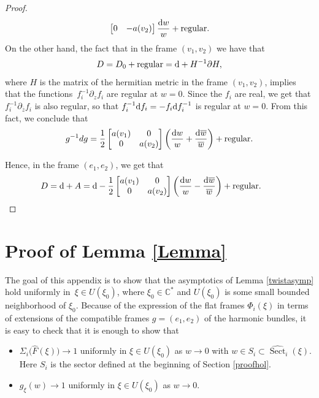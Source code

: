 \begin{proof}
\begin{equation*}
\begin{bmatrix}
 0 & -a(v_2) \\
 \end{bmatrix}\frac{{\rm d}w}{w}+\text{regular}.
\end{equation*}
On the other hand, the fact that in the frame $(v_1,v_2)$ we have that
\begin{equation*}
 D=D_0 +\text{regular}= {\rm d} + H^{-1}\partial H,
\end{equation*}
where $H$ is the matrix of the hermitian metric in the frame $(v_1,v_2)$,
implies that the functions~${f_i^{-1}\partial_{z} f_i}$ are regular at $w=0$. Since the $f_i$ are real, we get that $f_i^{-1}\partial_{\overline{z}}f_i$ is also regular, so that $f_i^{-1}{\rm d}f_i=-f_i{\rm d}f_i^{-1}$ is regular at $w=0$. From this fact, we conclude that
\begin{equation*}
 g^{-1}dg= \frac{1}{2}\begin{bmatrix} a(v_1) & 0 \\
 0 & a(v_2) \\
 \end{bmatrix}\left(\frac{{\rm d}w}{w}+ \frac{{\rm d}\overline{w}}{\overline{w}}\right) + \text{regular}.
\end{equation*}

Hence, in the frame $(e_1,e_2)$, we get that
\begin{equation*}
 D={\rm d}+A={\rm d} - \frac{1}{2}\begin{bmatrix} a(v_1) & 0 \\
 0 & a(v_2) \\
 \end{bmatrix}\left(\frac{{\rm d}w}{w}- \frac{{\rm d}\overline{w}}{\overline{w}}\right) + \text{regular}.\tag*{\qed}
\end{equation*} \renewcommand{\qed}{}
\end{proof}

\section{Proof of Lemma \ref{Lemma}}\label{AC}

The goal of this appendix is to show that the asymptotics of Lemma \ref{twistasymp} hold uniformly in~${\xi \in U(\xi_0)}$, where $\xi_0 \in \mathbb{C}^*$ and $U(\xi_0)$ is some small bounded neighborhood of $\xi_0$. Because of the expression of the flat frames $\Phi_i(\xi)$ in terms of extensions of the compatible frames $g=(e_1,e_2)$ of the harmonic bundles, it is easy to check that it is enough to show that
\begin{itemize}\itemsep=0pt
 \item $\Sigma_i\bigl(\widehat{F}(\xi)\bigr) \to 1$ uniformly in $\xi \in U(\xi_0)$ as $w\to 0$ with $w\in S_i \subset \widehat{\operatorname{Sect}}_i(\xi)$. Here $S_i$ is the sector defined at the beginning of Section \ref{proofhol}.
 \item $g_{\xi}(w)\to 1$ uniformly in $\xi \in U(\xi_0)$ as $w\to 0$.
\end{itemize}

